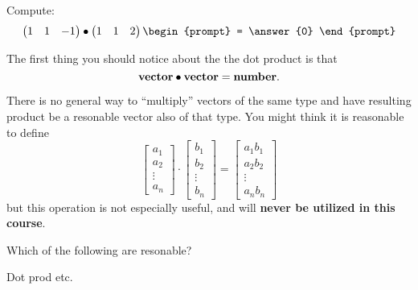 \documentclass{ximera}
\begin{document}
\begin{question}
  Compute:
  \[
  \begin{pmatrix} 1 & 1 & -1 \end{pmatrix}
  \dotp\begin{pmatrix} 1 & 1 & 2\end{pmatrix}
  \begin{prompt}
    = \answer{0}
  \end{prompt}
  \]
\end{question}


The first thing you should notice about the the dot product is that
\[
\mathbf{vector}\bullet \mathbf{vector} = \mathbf{number}.
\]

\begin{warning}
  There is no general way to ``multiply'' vectors of the same type and
  have resulting product be a resonable vector also of that type.
  You might think it is reasonable to define
\[
\begin{bmatrix}
  a_1\\
  a_2\\
  \vdots\\
  a_n
\end{bmatrix}
\cdot
\begin{bmatrix}
  b_1\\
  b_2\\
  \vdots\\
  b_n
\end{bmatrix}
=
\begin{bmatrix}
  a_1b_1\\
  a_2b_2\\
  \vdots\\
  a_nb_n
\end{bmatrix}
\] 
but this operation is not especially useful, and will \textbf{never be
  utilized in this course}.
\end{warning}

\begin{question}
  Which of the following are resonable?

  Dot prod etc.
\end{question}
\end{document}
